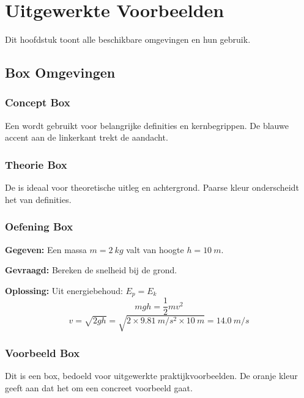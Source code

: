 
\chapter{Uitgewerkte Voorbeelden}
\label{ch:voorbeelden}

Dit hoofdstuk toont alle beschikbare omgevingen en hun gebruik.

\section{Box Omgevingen}

\subsection{Concept Box}
\begin{conceptbox}[title=Belangrijke Definitie]
Een  wordt gebruikt voor belangrijke definities en kernbegrippen.
De blauwe accent aan de linkerkant trekt de aandacht.
\end{conceptbox}

\subsection{Theorie Box}
\begin{theorieblok}[title=Theoretisch Kader]
De  is ideaal voor theoretische uitleg en achtergrond.
Paarse kleur onderscheidt het van definities.
\end{theorieblok}

\subsection{Oefening Box}
\begin{oefenblok}[title=Oefening 3.1]
\textbf{Gegeven:} Een massa $m = \SI{2}{kg}$ valt van hoogte $h = \SI{10}{m}$.

\textbf{Gevraagd:} Bereken de snelheid bij de grond.

\textbf{Oplossing:}
Uit energiebehoud: $E_p = E_k$
\[ mgh = \frac{1}{2}mv^2 \]
\[ v = \sqrt{2gh} = \sqrt{2 \times \SI{9.81}{m/s^2} \times \SI{10}{m}} = \SI{14.0}{m/s} \]
\end{oefenblok}

\subsection{Voorbeeld Box}
\begin{voorbeeld}[title=Praktisch Voorbeeld]
Dit is een  box, bedoeld voor uitgewerkte praktijkvoorbeelden.
De oranje kleur geeft aan dat het om een concreet voorbeeld gaat.
\end{voorbeeld}

